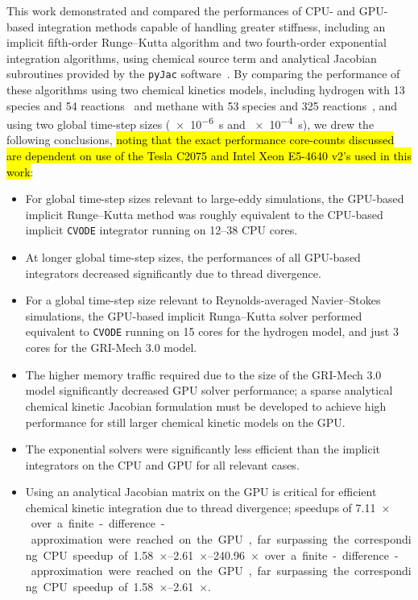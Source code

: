 \documentclass[preprint,review,11pt]{elsarticle}
\DeclareRobustCommand{\hly}[1]{\sethlcolor{yellow}\hl{#1}}
\begin{document}
This work demonstrated and compared the performances of CPU- and GPU-based integration methods capable of handling greater stiffness, including an implicit fifth-order Runge--Kutta algorithm and two fourth-order exponential integration algorithms, using chemical source term and analytical Jacobian subroutines provided by the \texttt{pyJac} software~\cite{niemeyer_2016_51139,Niemeyer:2015ws,Niemeyer:2016aa}.
By comparing the performance of these algorithms using two chemical kinetics models, including hydrogen with 13 species and 54 reactions~\cite{Burke:2011fh} and methane with 53 species and 325 reactions~\cite{smith_gri-mech_30}, and using two global time-step sizes (\SI{e-6}{\second} and \SI{e-4}{\second}), we drew the following conclusions, \hly{noting that the exact performance core-counts discussed are dependent on use of the Tesla C2075 and Intel Xeon E5-4640 v2's used in this work}:
\begin{itemize}
 \item For global time-step sizes relevant to large-eddy simulations, the GPU-based implicit Runge--Kutta method was roughly equivalent to the CPU-based implicit \texttt{CVODE} integrator running on \numrange{12}{38} CPU cores.
 \item At longer global time-step sizes, the performances of all GPU-based integrators decreased significantly due to thread divergence.
 \item For a global time-step size relevant to Reynolds-averaged Navier--Stokes simulations, the GPU-based implicit Runga--Kutta solver performed equivalent to \texttt{CVODE} running on \num{15} cores for the hydrogen model, and just \num{3} cores for the GRI-Mech 3.0 model.
 \item The higher memory traffic required due to the size of the GRI-Mech 3.0 model significantly decreased GPU solver performance; a sparse analytical chemical kinetic Jacobian formulation must be developed to achieve high performance for still larger chemical kinetic models on the GPU.
 \item The exponential solvers were significantly less efficient than the implicit integrators on the CPU and GPU for all relevant cases.
 \item Using an analytical Jacobian matrix on the GPU is critical for efficient chemical kinetic integration due to thread divergence; speedups of \SIrange{7.11}{240.96}{$\times$} over a finite-difference-approximation were reached on the GPU, far surpassing the corresponding CPU speedup of \SIrange{1.58}{2.61}{$\times$}.
\end{itemize}
\end{document}
